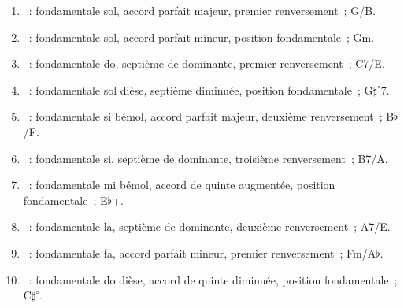 \begin{enumerate}[leftmargin=*, itemsep=1pt]
  \item {}~: fondamentale sol, accord parfait majeur, premier renversement~; G/B.
  \item {}~: fondamentale sol, accord parfait mineur, position fondamentale~; Gm.
  \item {}~: fondamentale do, septième de dominante, premier renversement~; C7/E.
  \item {}~: fondamentale sol dièse, septième diminuée, position fondamentale~; G$\sharp^{\circ}$7.
  \item {}~: fondamentale si bémol, accord parfait majeur, deuxième renversement~; B$\flat$/F.
  \item {}~: fondamentale si, septième de dominante, troisième renversement~; B7/A.
  \item {}~: fondamentale mi bémol, accord de quinte augmentée, position fondamentale~; E$\flat$+.
  \item {}~: fondamentale la, septième de dominante, deuxième renversement~; A7/E.
  \item {}~: fondamentale fa, accord parfait mineur, premier renversement~; Fm/A$\flat$.
  \item {}~: fondamentale do dièse, accord de quinte diminuée, position fondamentale~; C$\sharp^{\circ}$.
\end{enumerate}
